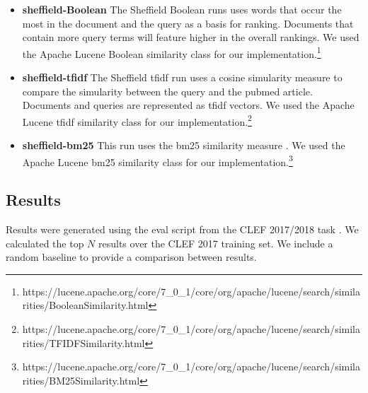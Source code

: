 \begin{itemize}
\item \textbf{sheffield-Boolean}  
The Sheffield Boolean runs uses words that occur the most in the document and the query as a basis for ranking. Documents that contain more query terms will feature higher in the overall rankings. We used the Apache Lucene Boolean similarity class for our implementation.\footnote{https://lucene.apache.org/core/7\_0\_1/core/org/apache/lucene/search/similarities/BooleanSimilarity.html}

\item \textbf{sheffield-tfidf} The Sheffield tfidf run uses a cosine simularity measure to compare the simularity between the query and the pubmed article. Documents and queries are represented as tfidf vectors. We used the Apache Lucene tfidf similarity class for our implementation.\footnote{https://lucene.apache.org/core/7\_0\_1/core/org/apache/lucene/search/similarities/TFIDFSimilarity.html}

\item \textbf{sheffield-bm25} This run uses the bm25 similarity measure \cite{Robertson96okapiat}. We used the Apache Lucene bm25 similarity class for our implementation.\footnote{https://lucene.apache.org/core/7\_0\_1/core/org/apache/lucene/search/similarities/BM25Similarity.html}

\end{itemize}

\subsection{Results}

Results were generated using the eval script from the CLEF 2017/2018 task \cite{Kanoulas12017}. We calculated the top $N$ results over the CLEF 2017 training set. We include a random baseline  to provide a comparison between results.


